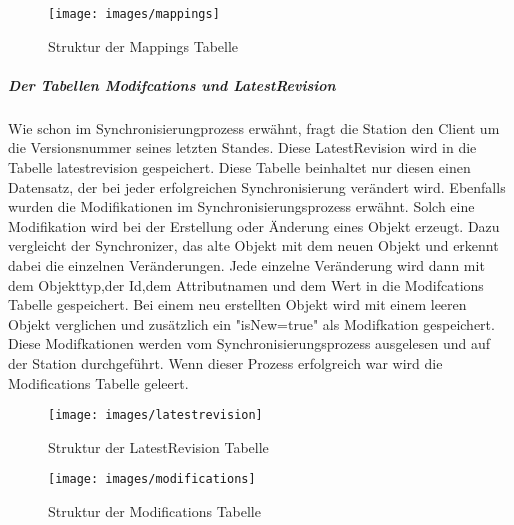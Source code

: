 \begin{figure}[H]
\centering
\texttt{[image: images/mappings]}
\caption{Struktur der Mappings Tabelle}
\end{figure}

\subparagraph{Der Tabellen Modifcations und LatestRevision}
Wie schon im Synchronisierungprozess erwähnt, fragt die Station den Client um die Versionsnummer seines letzten Standes. Diese LatestRevision wird in die Tabelle latestrevision gespeichert. Diese Tabelle beinhaltet nur diesen einen Datensatz, der bei jeder erfolgreichen Synchronisierung verändert wird.
Ebenfalls wurden die Modifikationen im Synchronisierungsprozess erwähnt. Solch eine Modifikation wird bei der Erstellung oder Änderung eines Objekt erzeugt. Dazu vergleicht der Synchronizer, das alte Objekt mit dem neuen Objekt und erkennt dabei die einzelnen Veränderungen. Jede einzelne Veränderung wird dann mit dem Objekttyp,der Id,dem Attributnamen und dem Wert in die Modifcations Tabelle gespeichert. Bei einem neu erstellten Objekt wird mit einem leeren Objekt verglichen und zusätzlich ein "isNew=true" als Modifkation gespeichert. Diese Modifkationen werden vom Synchronisierungsprozess ausgelesen und auf der Station durchgeführt. Wenn dieser Prozess erfolgreich war wird die Modifications Tabelle geleert.


\begin{figure}[H]
  \centering
  \begin{minipage}[t]{7 cm}
    \centering
    \texttt{[image: images/latestrevision]} 
    \caption{Struktur der LatestRevision Tabelle}
  \end{minipage}
  \hspace{0.5cm}
  \begin{minipage}[t]{7 cm}
	\centering
	\texttt{[image: images/modifications]}  
    \caption{Struktur der Modifications Tabelle}
  \end{minipage}
  
\end{figure}









 











